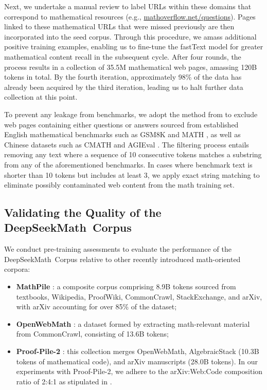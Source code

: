 Next, we undertake a manual review to label URLs within these domains that correspond to mathematical resources (e.g., \url{mathoverflow.net/questions}). Pages linked to these mathematical URLs that were missed previously are then incorporated into the seed corpus. Through this procedure, we amass additional positive training examples, enabling us to fine-tune the fastText model for greater mathematical content recall in the subsequent cycle. After four rounds, the process results in a collection of 35.5M mathematical web pages, amassing 120B tokens in total. By the fourth iteration, approximately 98\% of the data has already been acquired by the third iteration, leading us to halt further data collection at this point.

To prevent any leakage from benchmarks, we adopt the method from \cite{deepseek-coder} to exclude web pages containing either questions or answers sourced from established English mathematical benchmarks such as GSM8K \citep{gsm8k} and MATH \citep{MATH}, as well as Chinese datasets such as CMATH \citep{wei2023cmath} and AGIEval \citep{agieval}. The filtering process entails removing any text where a sequence of 10 consecutive tokens matches a substring from any of the aforementioned benchmarks. In cases where benchmark text is shorter than 10 tokens but includes at least 3, we apply exact string matching to eliminate possibly contaminated web content from the math training set.

\subsection{Validating the Quality of the DeepSeekMath~Corpus}

We conduct pre-training assessments to evaluate the performance of the DeepSeekMath~Corpus relative to other recently introduced math-oriented corpora:

\begin{itemize}[topsep=0pt]
    \item \textbf{MathPile} \citep{mathpile}: a composite corpus comprising 8.9B tokens sourced from textbooks, Wikipedia, ProofWiki, CommonCrawl, StackExchange, and arXiv, with arXiv accounting for over 85\% of the dataset;
    \item \textbf{OpenWebMath} \citep{openwebmath}: a dataset formed by extracting math-relevant material from CommonCrawl, consisting of 13.6B tokens;
    \item \textbf{Proof-Pile-2} \citep{llemma}: this collection merges OpenWebMath, AlgebraicStack (10.3B tokens of mathematical code), and arXiv manuscripts (28.0B tokens). In our experiments with Proof-Pile-2, we adhere to the arXiv:Web:Code composition ratio of 2:4:1 as stipulated in \cite{llemma}.
\end{itemize}

